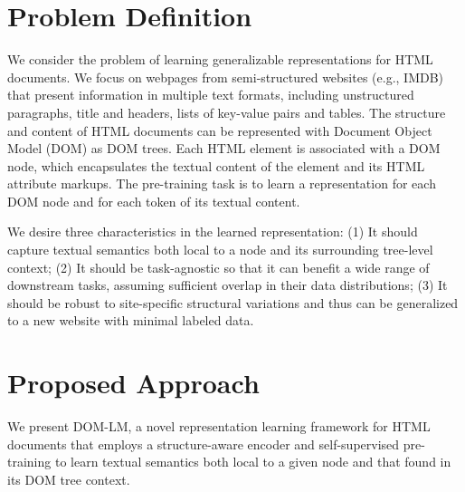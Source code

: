 \documentclass[sigconf, nonacm]{acmart}
\newcommand{\ours}[0]{DOM-LM}
\newcommand{\nop}[1]{}
\begin{document}
 \section{Problem Definition}
We consider the problem of learning generalizable representations for HTML documents. We focus on webpages from semi-structured websites (e.g., IMDB) that present information in multiple text formats, including unstructured paragraphs, title and headers, lists of key-value pairs and tables. The structure and content of HTML documents can be represented with Document Object Model (DOM) as DOM trees. Each HTML element is associated with a DOM node, which encapsulates the textual content of the element and its HTML attribute markups. The pre-training task is to learn a representation for each DOM node and for each token of its textual content. 

We desire three characteristics in the learned representation: (1) It should capture textual semantics both local to a node and its surrounding tree-level context; (2) It should be task-agnostic so that it can benefit a wide range of downstream tasks, assuming sufficient overlap in their data distributions; (3) It should be robust to site-specific structural variations and thus can be generalized to a new website with minimal labeled data. \nop{Since we are learning representations for nodes and tokens, I think it would help to clarify what a DOM node is and what we mean by a token more concretely.}

 \section{Proposed Approach}
We present \ours, a novel representation learning framework for HTML documents that employs a structure-aware encoder and self-supervised pre-training to learn textual semantics both local to a given node and that found in its DOM tree context. 
\nop{Here we should provide the key intuition and ideas behind our approach, a diagram depicting the architecture, and a high-level description of its its key components. We can provide details about the individual components in the sections below. You could start with something like: Our aim is to leverage the capacity of existing language model architectures like BERT for better pre-training for HTML documents... Then talk about what constitutes "context" in HTML setting, what position embedding means in this setting. Then introduce the key innovation: 1) tree transformation into constituent subtrees 2) novel position assignments for learning position embeddings.}
\end{document}
